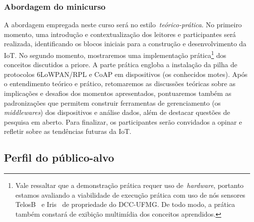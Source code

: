 \documentclass{SBCbookchapter}
\begin{document}

\subsubsection{Abordagem do minicurso}

A abordagem empregada neste curso será no estilo~\textit{teórico-prática}. No 
primeiro momento, uma introdução e contextualização dos leitores e participantes 
será realizada, identificando os blocos iniciais para a construção e 
desenvolvimento da IoT. No segundo momento, mostraremos uma implementação 
prática\footnote{Vale ressaltar que a demonstração prática requer uso 
de~\textit{hardware}, portanto estamos avaliando a viabilidade de execução 
prática com uso de nós sensores TelosB~\cite{memsic2015telosb} e 
Iris~\cite{memsic2015iris} de propriedade do DCC-UFMG. De todo modo, a prática 
também constará de exibição multimídia dos conceitos aprendidos.} dos conceitos 
discutidos a priore. A parte prática engloba a instalação da pilha de 
protocolos 6LoWPAN/RPL e CoAP em dispositivos (os conhecidos motes). Após o 
entendimento teórico e prático, retomaremos as discussões teóricas sobre as 
implicações e desafios dos momentos apresentados, pontuaremos também as 
padronizações que permitem construir ferramentas de gerenciamento (os 
\textit{middlewares}) dos dispositivos e análise dados, além de destacar 
questões de pesquisa em aberto. Para finalizar, os participantes serão 
convidados a opinar e refletir sobre as tendências futuras da IoT.

\subsection{Perfil do público-alvo}
\end{document}

